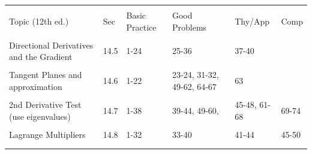 \documentclass[10pt,]{book}
\theoremstyle{plain}
\theoremstyle{definition}
\theoremstyle{definition}
\theoremstyle{definition}
\theoremstyle{definition}
\theoremstyle{definition}
\numberwithin{equation}{section}
\newcommand{\hrulethin}  {\noalign{\hrule height 0.04em}}
\begin{document}
\begin{tabular}{llllll}
&&&&&\tabularnewline\hrulethin
Topic (12th ed.)&Sec&Basic Practice&Good Problems&Thy/App&Comp\tabularnewline[0pt]
&&&&&\tabularnewline\hrulethin
Directional Derivatives and the Gradient&14.5&1-24&25-36&37-40&\tabularnewline[0pt]
&&&&&\tabularnewline\hrulethin
Tangent Planes and approximation&14.6&1-22&23-24, 31-32, 49-62, 64-67&63&\tabularnewline[0pt]
&&&&&\tabularnewline\hrulethin
2nd Derivative Test (use eigenvalues)&14.7&1-38&39-44, 49-60,&45-48, 61-68&69-74\tabularnewline[0pt]
&&&&&\tabularnewline\hrulethin
Lagrange Multipliers&14.8&1-32&33-40&41-44&45-50\tabularnewline[0pt]
&&&&&\tabularnewline\hrulethin
\end{tabular}
\typeout{************************************************}
\typeout{************************************************}
\end{document}
